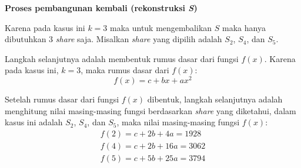 \begin{flushleft}
	\textbf{Proses pembangunan kembali (rekonstruksi \textit{S})}
\end{flushleft}

Karena pada kasus ini \begin{math}k=3\end{math} maka untuk mengembalikan \begin{math}S\end{math} maka hanya dibutuhkan 3 \textit{share} saja. Misalkan \textit{share} yang dipilih adalah \begin{math}S_2\end{math}, \begin{math}S_4\end{math}, dan \begin{math}S_5\end{math}.

Langkah selanjutnya adalah membentuk rumus dasar dari fungsi \begin{math}f(x)\end{math}. Karena pada kasus ini, \begin{math}k=3\end{math}, maka rumus dasar dari \begin{math}f(x)\end{math}:
\begin{displaymath}
	f(x) = c + bx + ax^2
\end{displaymath}

Setelah rumus dasar dari fungsi \begin{math}f(x)\end{math} dibentuk, langkah selanjutnya adalah menghitung nilai masing-masing fungsi berdasarkan \textit{share} yang diketahui, dalam kasus ini adalah \begin{math}S_2\end{math}, \begin{math}S_4\end{math}, dan \begin{math}S_5\end{math}, maka nilai masing-masing fungsi \begin{math}f(x)\end{math}:
\begin{gather*}
	f(2) = c + 2b + 4a = 1928	\\
	f(4) = c + 2b + 16a = 3062	\\
	f(5) = c + 5b + 25a = 3794
\end{gather*}

